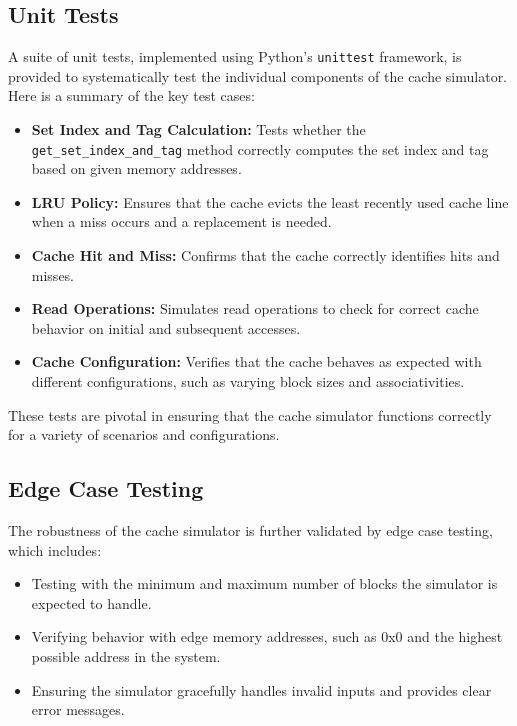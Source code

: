 \documentclass[12pt]{article}
\begin{document}
\subsection{Unit Tests}

A suite of unit tests, implemented using Python's \texttt{unittest} framework, is provided to systematically test the individual components of the cache simulator. Here is a summary of the key test cases:

\begin{itemize}
    \item \textbf{Set Index and Tag Calculation:} Tests whether the \texttt{get\_set\_index\_and\_tag} method correctly computes the set index and tag based on given memory addresses.
          \newpage
          \vspace*{1cm}
    \item \textbf{LRU Policy:} Ensures that the cache evicts the least recently used cache line when a miss occurs and a replacement is needed.
    \item \textbf{Cache Hit and Miss:} Confirms that the cache correctly identifies hits and misses.
    \item \textbf{Read Operations:} Simulates read operations to check for correct cache behavior on initial and subsequent accesses.
    \item \textbf{Cache Configuration:} Verifies that the cache behaves as expected with different configurations, such as varying block sizes and associativities.
\end{itemize}

These tests are pivotal in ensuring that the cache simulator functions correctly for a variety of scenarios and configurations.

\subsection{Edge Case Testing}

The robustness of the cache simulator is further validated by edge case testing, which includes:

\begin{itemize}
    \item Testing with the minimum and maximum number of blocks the simulator is expected to handle.
    \item Verifying behavior with edge memory addresses, such as 0x0 and the highest possible address in the system.
    \item Ensuring the simulator gracefully handles invalid inputs and provides clear error messages.
\end{itemize}
\end{document}
